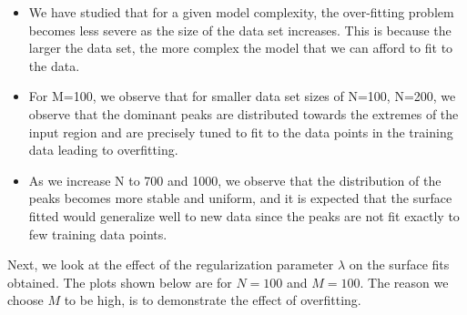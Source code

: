 \documentclass{article}
\begin{document}
\begin{itemize}
\item We have studied that for a given model complexity, the over-fitting problem becomes less severe as the size of the data set increases. This is because the larger the data set, the more complex the model that we can afford to fit to the data.
\item For M=100, we observe that for smaller data set sizes of N=100, N=200, we observe that the dominant peaks are distributed towards the extremes of the input region and are precisely tuned to fit to the data points in the training data leading to overfitting.
\item As we increase N to 700 and 1000, we observe that the distribution of the peaks becomes more stable and uniform, and it is expected that the surface fitted would generalize well to new data since the peaks are not fit exactly to few training data points.
\end{itemize}

\begin{flushleft}
Next, we look at the effect of the regularization parameter $\lambda$ on the surface fits obtained. The plots shown below are for $N = 100$ and $M = 100$. The reason we choose $M$ to be high, is to demonstrate the effect of overfitting.

\end{flushleft}
\end{document}
